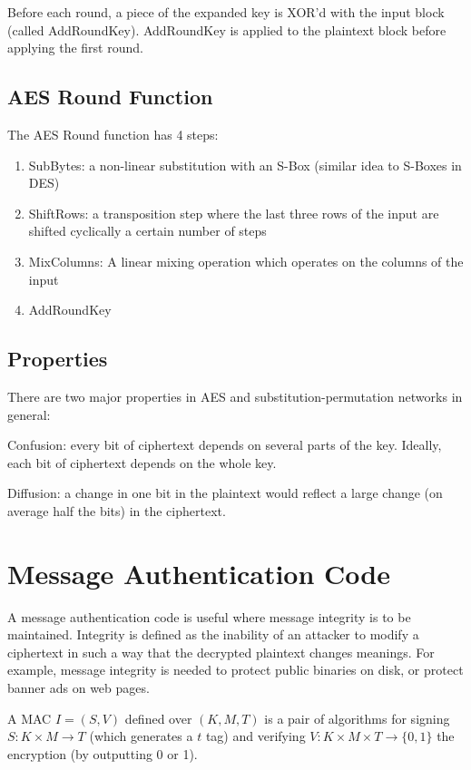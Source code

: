 \documentclass{article}
\begin{document}
\begin{multicols}{2}
Before each round, a piece of the expanded key is XOR'd with the input block (called AddRoundKey). AddRoundKey is applied to the plaintext block before applying the first round. 

\subsection{AES Round Function}

The AES Round function has 4 steps:

\begin{enumerate}
    \item SubBytes: a non-linear substitution with an S-Box (similar idea to S-Boxes in DES)
    \item ShiftRows: a transposition step where the last three rows of the input are shifted cyclically a certain number of steps
    \item MixColumns: A linear mixing operation which operates on the columns of the input
    \item AddRoundKey 
\end{enumerate}

\subsection{Properties}

There are two major properties in AES and substitution-permutation networks in general:

Confusion: every bit of ciphertext depends on several parts of the key. Ideally, each bit of ciphertext depends on the whole key.

Diffusion: a change in one bit in the plaintext would reflect a large change (on average half the bits) in the ciphertext.

\section{Message Authentication Code}

A message authentication code is useful where message integrity is to be maintained. Integrity is defined as the inability of an attacker to modify a ciphertext in such a way that the decrypted plaintext changes meanings. For example, message integrity is needed to protect public binaries on disk, or protect banner ads on web pages.

A MAC $I = (S,V)$ defined over $(K,M,T)$ is a pair of algorithms for signing $S: K \times M \rightarrow T$ (which generates a $t$ tag) and verifying $V: K \times M \times T \rightarrow \{0,1\}$ the encryption (by outputting 0 or 1).


\end{multicols}
\end{document}
